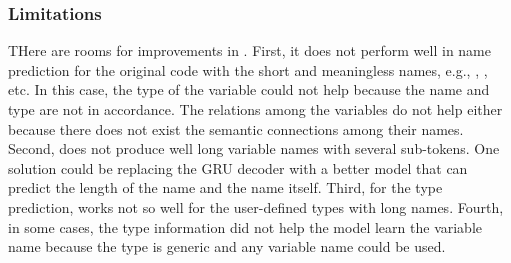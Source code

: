\subsubsection{Limitations}
\label{sec:limitations}

THere are rooms for improvements in {\tool}. First, it does not
perform well in name prediction for the original code with the short
and meaningless names, e.g., , , etc. In this case,
the type of the variable could not help because the name and type are
not in accordance. The relations among the variables do not help
either because there does not exist the semantic connections among
their names. Second, {\tool} does not produce well long variable names
with several sub-tokens. One solution could be replacing the GRU
decoder with a better model that can predict the length of the name
and the name itself. Third, for the type prediction, {\tool} works not
so well for the user-defined types with long names. Fourth, in some cases,
the type information did not help the model learn the variable name
because the type is generic and any variable name could be used.
